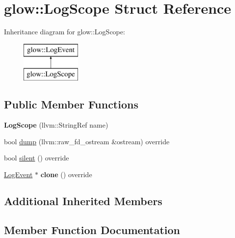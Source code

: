 \hypertarget{structglow_1_1_log_scope}{}\section{glow\+:\+:Log\+Scope Struct Reference}
\label{structglow_1_1_log_scope}
Inheritance diagram for glow\+:\+:Log\+Scope\+:\begin{figure}[H]
\begin{center}
\leavevmode
\includegraphics[height=2.000000cm]{structglow_1_1_log_scope}
\end{center}
\end{figure}
\subsection*{Public Member Functions}
\begin{DoxyCompactItemize}
\item 
\mbox{\label{structglow_1_1_log_scope_a8bc78b0bac9ef7a78c082cd1d73c97c2}} 
{\bfseries Log\+Scope} (llvm\+::\+String\+Ref name)
\item 
bool \hyperlink{structglow_1_1_log_scope_acab7040ff048222a7128d9d7c43bb92a}{dump} (llvm\+::raw\+\_\+fd\+\_\+ostream \&ostream) override
\item 
bool \hyperlink{structglow_1_1_log_scope_a4e7568406d6fec066b79bee89d0a9d1a}{silent} () override
\item 
\mbox{\label{structglow_1_1_log_scope_a46b72a306904236277651a7b6fa0e3eb}} 
\hyperlink{structglow_1_1_log_event}{Log\+Event} $\ast$ {\bfseries clone} () override
\end{DoxyCompactItemize}
\subsection*{Additional Inherited Members}


\subsection{Member Function Documentation}
\mbox{\label{structglow_1_1_log_scope_acab7040ff048222a7128d9d7c43bb92a}} 
